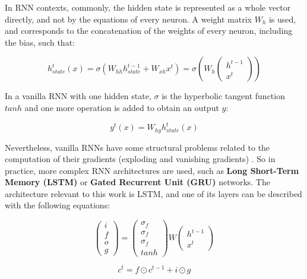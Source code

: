 In RNN contexts, commonly, the hidden state is represented as a whole vector directly, and not by the equations of every neuron. A weight matrix $W_{h}$ is used, and corresponds to the concatenation of the weights of every neuron, including the bias, such that:

\begin{equation}
    h_{state}^{t}(x) = \sigma(W_{hh} h_{state}^{t-1} + W_{xh} x^{t}) = \sigma \left(W_{h} \begin{pmatrix} h^{t-1} \\ x^{t} \end{pmatrix} \right)
\end{equation}

In a vanilla RNN with one hidden state, $\sigma$ is the hyperbolic tangent function $tanh$ and one more operation is added to obtain an output $y$:

\begin{equation}
    y^{t}(x) = W_{hy}h_{state}^{t}(x)
\end{equation}

Nevertheless, vanilla RNNs have some structural problems related to the computation of their gradients (exploding and vanishing gradients) \cite{bengio1994learning, pascanu2013difficulty}. So in practice, more complex RNN architectures are used, such as \textbf{Long Short-Term Memory (LSTM)} \cite{hochreiter1997long} or \textbf{Gated Recurrent Unit (GRU)} \cite{cho2014learning} networks. The architecture relevant to this work is LSTM, and one of its layers can be described with the following equations:

\begin{equation}
    \begin{pmatrix} i \\ f \\ o \\ g \end{pmatrix} = \begin{pmatrix} \sigma_{f} \\ \sigma_{f} \\ \sigma_{f} \\ tanh \end{pmatrix} W \begin{pmatrix} h^{t-1} \\ x^{t} \end{pmatrix} 
\end{equation}

\begin{equation}
    c^{t} = f \odot c^{t-1} + i \odot g
\end{equation}

